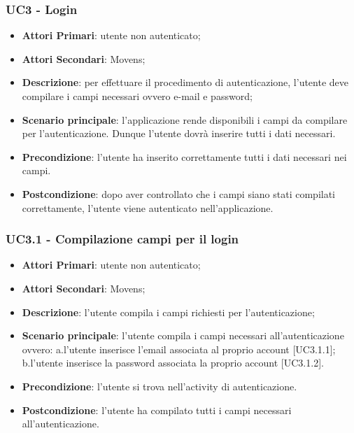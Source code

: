 
\subsubsection{UC3 - Login}
\begin{itemize}
	\item \textbf{Attori Primari}: utente non autenticato;
	\item \textbf{Attori Secondari}: Movens\glo;
	\item \textbf{Descrizione}: per effettuare il procedimento di autenticazione, l'utente deve compilare i campi necessari ovvero e-mail e password;
	\item \textbf{Scenario principale}: l'applicazione rende disponibili i campi da compilare per l'autenticazione. Dunque l'utente dovrà inserire tutti i dati necessari.
	
	\item \textbf{Precondizione}: l'utente ha inserito correttamente tutti i dati necessari nei campi.
	\item \textbf{Postcondizione}: dopo aver controllato che i campi siano stati compilati correttamente, l'utente viene autenticato nell'applicazione.	
\end{itemize}

\subsubsection{UC3.1 - Compilazione campi per il login}
\begin{itemize}
	\item \textbf{Attori Primari}: utente non autenticato;
	\item \textbf{Attori Secondari}: Movens\glo;
	\item \textbf{Descrizione}: l'utente compila i campi richiesti per l'autenticazione;
	\item \textbf{Scenario principale}: l'utente compila i campi necessari all'autenticazione ovvero: a.l'utente inserisce l'email associata al proprio account [UC3.1.1];
	\newline
	b.l'utente inserisce la password associata la proprio account [UC3.1.2].	
	\item \textbf{Precondizione}: l'utente si trova nell'activity di autenticazione.
	\item \textbf{Postcondizione}: l'utente ha compilato tutti i campi necessari all'autenticazione.	
\end{itemize}

